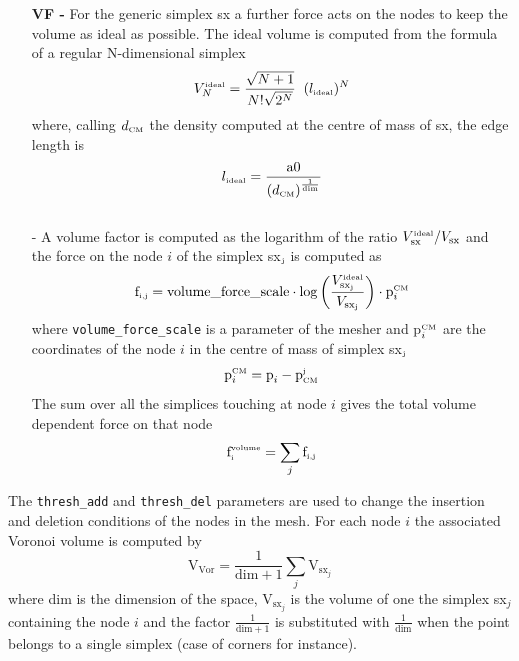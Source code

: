 \documentclass[10pt,a4paper]{book}
\newcommand{\py}[1]{\texttt{\color{blue}#1}}
\begin{document}
\begin{itemize}
\item[\textbf {VF -}] For the generic simplex sx a further force acts
  on the nodes to keep the volume as ideal as possible. The ideal
  volume is computed from the formula of a regular N-dimensional
  simplex 
  \begin{equation}
    V^{\textrm{\tiny ideal}}_N = \frac{\sqrt{N+1}}{N! \sqrt{2^N}} \;\;
    (l_{\textrm{\tiny ideal}})^N 
  \end{equation}
  where, calling $d_{\textrm{\tiny CM}}$ the density computed at the
  centre of mass of sx, the edge length is 
  \begin{equation}
    l_{\textrm{\tiny ideal}} = \frac{\textrm{a0}}{
      \left(d_{\textrm{\tiny CM}}\right)^{\frac{1}{\textrm{\tiny dim}}}}
  \end{equation} \\
  - A volume  factor is computed as the logarithm of
  the ratio $V^{\textrm{\tiny ideal}}_{\textrm{sx}}/V_{\textrm{sx}}$
  and the force on the node $i$ of the simplex sx$_{\textrm{\tiny j}}$
  is computed as    
  \begin{equation}
    \textrm{f}_{\textrm{\tiny i,j}} =
    \textrm{volume\_force\_scale} \cdot \log \left(
      \frac{V^{\textrm{\tiny ideal}}_{\textrm{sx}_{\textrm{\tiny 
            j}}}}{V_{\textrm{sx}_{\textrm{\tiny j}}}} \right) 
    \cdot \textrm{p}^{\textrm{\tiny CM}}_{\tiny i}    
  \end{equation}
  where \py{volume\_force\_scale} is a parameter of the mesher and 
  p$^{\textrm{\tiny CM}}_{\tiny i}$ are the coordinates of the node
  $i$ in the centre of mass of simplex sx$_{\textrm{\tiny 
      j}}$ 
  \begin{equation}
    \textrm{p}^{\textrm{\tiny CM}}_{\tiny i} =
    \textrm{p}_{\tiny i} - \textrm{p}^{\textrm{\tiny
        j}}_{\textrm{\tiny CM}}
  \end{equation}
  The sum over all the simplices touching at node $i$ gives the total
  volume dependent force on that node
  \begin{equation}
    \textrm{f}^{\textrm{\tiny volume}}_{\textrm{\tiny i}} = \sum_j
    \textrm{f}_{\textrm{\tiny i,j}}  
  \end{equation}
\end{itemize}


The \py{thresh\_add} and \py{thresh\_del} parameters are used to
change the insertion and deletion conditions of the nodes in the
mesh. For each node $i$ the associated Voronoi volume is computed by
\begin{equation}
  \textrm{V}_\textrm{Vor} = \frac{1}{\textrm{dim}+1} 
  \sum_j  \textrm{V}_{\textrm{sx}_j} 
    \nonumber
\end{equation}
where dim is the dimension of the space, V$_{\textrm{sx}_j}$ is the
volume of one the simplex sx$_j$ containing the node $i$ and the
factor $\frac{1}{\textrm{dim}+1}$ is substituted with
$\frac{1}{\textrm{dim}}$ when the point belongs to a single simplex
(case of corners for instance). 
\end{document}

